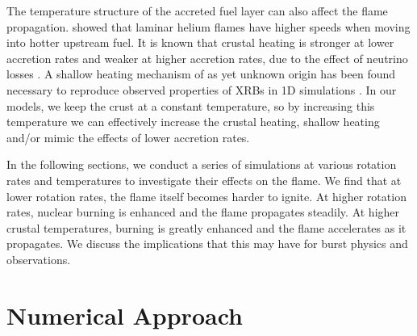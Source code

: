 \documentclass[preprint,times,tighten]{aastex63}
\begin{document}
The temperature structure of the accreted fuel layer can also affect
the flame propagation.  \citet{Timmes00} showed that laminar helium flames 
have higher speeds when moving into hotter upstream fuel.
It is known that crustal heating is stronger at lower
accretion rates and weaker at higher accretion rates, due to the
effect of neutrino losses \citep{Cumming2006,johnston:2019}. 
A shallow heating
mechanism of as yet unknown origin has been found necessary to
reproduce observed properties of XRBs in 1D simulations
\citep{Deibel2015,Turlione2015,Keek2017}.
In our
models, we keep the crust at a constant temperature, so by increasing
this temperature we can effectively increase the crustal heating, shallow heating
and/or
mimic the effects of lower accretion rates. 

In the following sections, we conduct a series of simulations at various rotation 
rates and temperatures to investigate their effects on the flame. We find that 
at lower rotation rates, the flame itself becomes harder to ignite. At higher 
rotation rates, nuclear burning is enhanced and the flame propagates steadily. 
At higher crustal temperatures, burning is greatly enhanced and the flame accelerates as 
it propagates. We discuss the implications that this may have for burst physics 
and observations. 


\section{Numerical Approach}\label{Sec:numerics}
\end{document}
